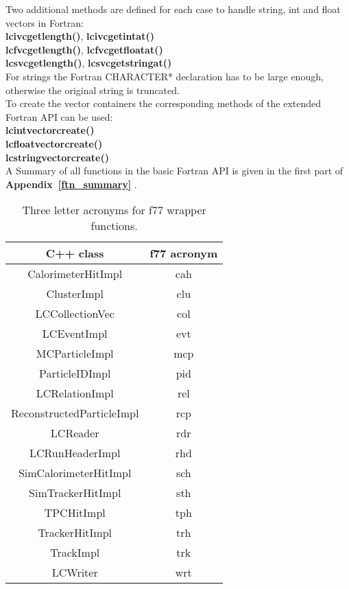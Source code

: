 Two additional methods are defined for each case to handle string, int and float vectors in Fortran:\\

{\bf lcivcgetlength()}, {\bf lcivcgetintat()}  \\
{\bf lcfvcgetlength()}, {\bf lcfvcgetfloatat()} \\
{\bf lcsvcgetlength()}, {\bf lcsvcgetstringat()}  \\

For strings the Fortran CHARACTER* declaration has to be large enough, otherwise the original
string is truncated.\\

To create the vector containers the corresponding methods of the extended Fortran API can be used: \\

 {\bf lcintvectorcreate()} \\
 {\bf lcfloatvectorcreate()} \\
 {\bf lcstringvectorcreate()} \\

A Summary of all functions in the basic Fortran API is given in the first part of {\bf Appendix~\ref{ftn_summary} }.


\begin{table}
\begin{center}
\begin{tabular}{|c|c|}
\hline
\rule[-5mm]{0mm}{10mm} C++ class  &  f77 acronym   \\ \hline \hline

 CalorimeterHitImpl         & cah \\ \hline
 ClusterImpl                & clu \\ \hline
 LCCollectionVec            & col \\ \hline
 LCEventImpl                & evt \\ \hline
 MCParticleImpl             & mcp \\ \hline
 ParticleIDImpl             & pid \\ \hline
 LCRelationImpl             & rel \\ \hline
 ReconstructedParticleImpl  & rcp \\ \hline
 LCReader                   & rdr \\ \hline
 LCRunHeaderImpl            & rhd \\ \hline
 SimCalorimeterHitImpl      & sch \\ \hline
 SimTrackerHitImpl          & sth \\ \hline
 TPCHitImpl                 & tph \\ \hline
 TrackerHitImpl             & trh \\ \hline
 TrackImpl                  & trk \\ \hline
 LCWriter                   & wrt \\ \hline

\end{tabular}
\end{center}
\caption{Three letter acronyms for f77 wrapper functions.}
\label{tab_f77}
\end{table}


